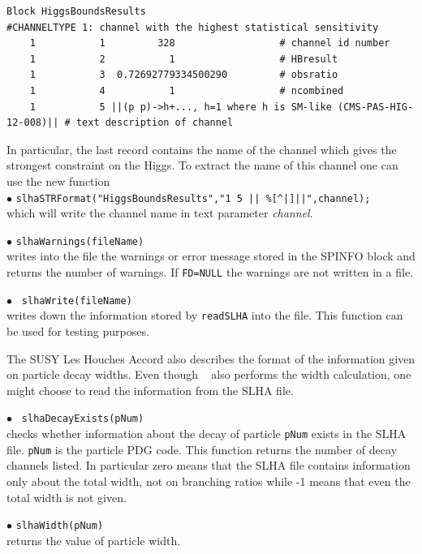 \documentclass[12pt,a4paper]{article}
\begin{document}
{\scriptsize
\begin{verbatim}
Block HiggsBoundsResults 
#CHANNELTYPE 1: channel with the highest statistical sensitivity
    1           1         328                  # channel id number
    1           2           1                  # HBresult
    1           3  0.72692779334500290         # obsratio
    1           4           1                  # ncombined
    1           5 ||(p p)->h+..., h=1 where h is SM-like (CMS-PAS-HIG-12-008)|| # text description of channel
\end{verbatim}
}

\noindent 
In particular, the last record contains  the  name of the channel which gives the strongest constraint on the Higgs.  To extract the name
of this channel one can use the new function\\

\noindent
$\bullet$ \verb!slhaSTRFormat("HiggsBoundsResults","1 5 || %[^|]||",channel);!\\
which will write the channel name  in text parameter {\it channel}. 

\noindent
$\bullet$ \verb|slhaWarnings(fileName)|\\                                                                              
writes into the file the warnings or error message  stored in the SPINFO block and
returns the number of warnings. If \verb|FD=NULL| the warnings are not written in a file.

\noindent
$\bullet$ \verb| slhaWrite(fileName)|\\
 writes down the information stored by 
\verb|readSLHA| into the file. This function can be used for testing purposes.

The SUSY Les Houches Accord also describes the format of the information given on particle decay widths.  
Even though \micro~ also performs the width calculation, one might choose to read the information from the SLHA file. 
 


\noindent
$\bullet$ \verb| slhaDecayExists(pNum)|\\
checks whether information about the  decay of particle \verb|pNum| exists in the SLHA file. 
\verb|pNum| is the particle PDG code. This function returns the number 
of decay channels listed. 
In particular zero means that the SLHA file contains  information only about the total width, not on branching ratios while 
-1 means that even the total width is not given.

\noindent
$\bullet$ \verb|slhaWidth(pNum)|\\ returns the value of particle width.
\end{document}

